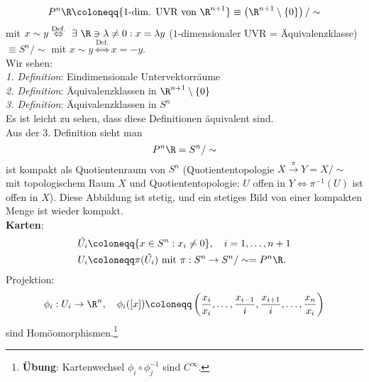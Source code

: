 \begin{example}
\begin{enumerate}
\begin{equation*}
        P^n\R \coloneqq \{ \text{1-dim. UVR von } \R^{n+1} \} \equiv \left( \R^{n+1} \setminus \{ 0 \} \right) /\sim
      \end{equation*}
      mit \( x \sim y \overset{\text{Def.}}{\Leftrightarrow} \ \exists \ \R \ni \lambda \neq 0 : x = \lambda y \) (\( 1 \)-dimensionaler UVR = Äquivalenzklasse) \( \equiv S^n/\sim \) mit \( x \sim y \overset{\text{Def.}}{\Leftrightarrow} x = -y \). \\
      Wir sehen: \\
      \emph{1. Definition}: Eindimensionale Untervektorräume \\
      \emph{2. Definition}: Äquivalenzklassen in \( \R^{n+1} \setminus \{ 0 \} \) \\
      \emph{3. Definition}: Äquivalenzklassen in \( S^n \) \\
      Es ist leicht zu sehen, dass diese Definitionen äquivalent sind. \\
      Aus der 3. Definition sieht man
      \begin{equation*}
        P^n\R = S^n/\sim
      \end{equation*}
      ist kompakt als Quotientenraum von \( S^n \) (Quotiententopologie \( X \overset{\pi}{\to} Y = X/\sim \) mit topologischem Raum \( X \) und Quotiententopologie: \( U \) offen in \( Y \Leftrightarrow \pi^{-1}(U) \) ist offen in \( X \)). Diese Abbildung ist stetig, und ein stetiges Bild von einer kompakten Menge ist wieder kompakt. \\
      \textbf{Karten}:
      \begin{align*}
        \tilde{U_i} &\coloneqq \{ x \in S^n : x_i \neq 0 \}, \quad i = 1, \dots, n+1 \\
        U_i &\coloneqq \pi(\tilde{U_i}) \text{ mit } \pi: S^n \to S^n/\sim = P^n\R\text{.}
      \end{align*}
      Projektion:
      \begin{equation*}
        \phi_i : U_i \to \R^n, \quad \phi_i([x]) \coloneqq \left( \frac{x_i}{x_i}, \dots, \frac{x_{i-1}}{i}, \frac{x_{i+1}}{i}, \dots, \frac{x_n}{x_i} \right)
      \end{equation*}
      sind Homöomorphismen.\footnote{\textbf{Übung}: Kartenwechsel \( \phi_i \circ \phi_j^{-1} \) sind \( C^\infty \).}
  \end{enumerate}
\end{example}


